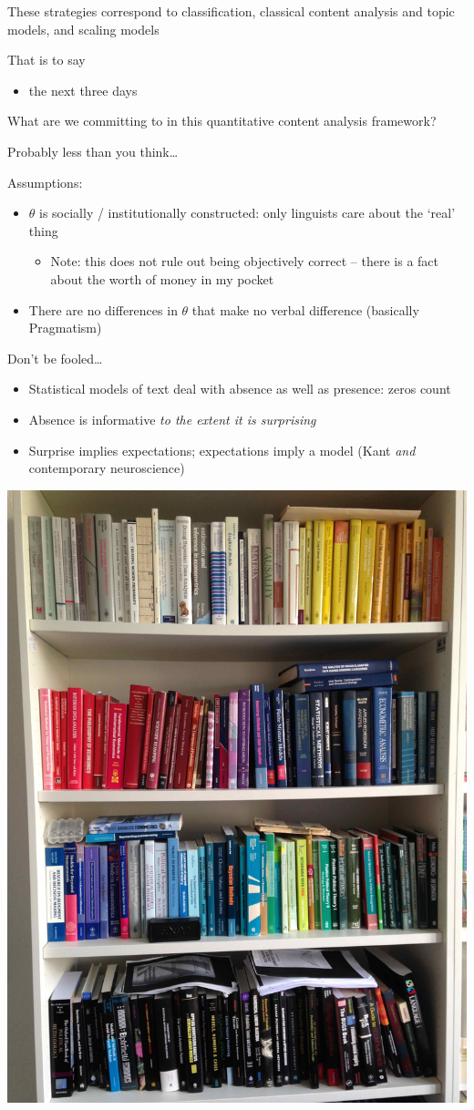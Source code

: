 \documentclass[11pt,compress,professionalfonts]{beamer}
\newcommand{\ita}{\begin{itemize}}
\newcommand{\itm}{\item[]}
\newcommand{\itz}{\end{itemize}}
\begin{document}
These strategies correspond to classification, classical content analysis and topic models, and scaling models

That is to say
\ita
\itm the next three days
\itz


What are we committing to in this quantitative content analysis framework?

Probably less than you think\ldots

Assumptions: 
\ita
\itm $\theta$ is socially / institutionally constructed: only linguists care about the `real' thing
\ita
\itm Note: this does not rule out being objectively correct -- there is a fact about the worth of money in my pocket
\itz
\itm There are no differences in $\theta$ that make no verbal difference (basically Pragmatism)
\itz


Don't be fooled\ldots
\ita
\itm Statistical models of text deal with absence as well as presence: zeros count
\itm Absence is informative \textit{to the extent it is surprising}
\itm Surprise implies expectations; expectations imply a model (Kant \textit{and} contemporary neuroscience)
\itz

\newpage

\centerline{\includegraphics[scale=.12]{pictures/distant-reading}}
\end{document}
